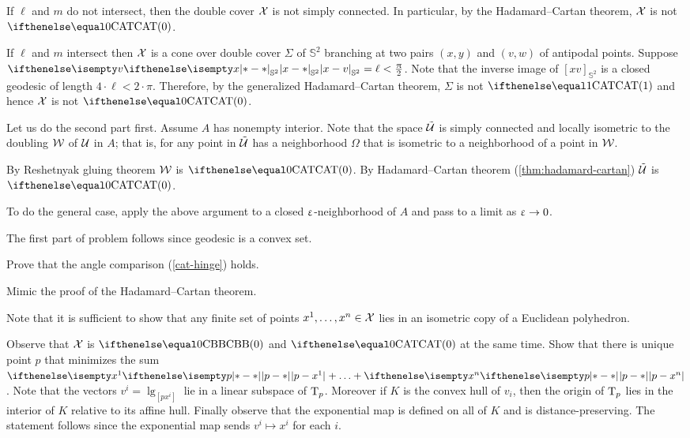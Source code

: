 If $\ell$ and $m$ do not intersect, then the double cover $\mathcal{X}$ is not simply connected.
In particular, by the Hadamard--Cartan theorem, $\mathcal{X}$ is not $\CAT0$.

If $\ell$ and $m$ intersect then $\mathcal{X}$ is a cone over double cover $\Sigma$ of $\mathbb{S}^2$ branching at two pairs $(x,y)$ and $(v,w)$ of antipodal points.
Suppose $\dist{x}{v}{\mathbb{S}^2}=\ell<\tfrac\pi2$.
Note that the inverse image of $[xv]_{\mathbb{S}^2}$ is a closed geodesic of length $4\cdot\ell<2\cdot\pi$.
Therefore, by the generalized Hadamard--Cartan theorem, $\Sigma$ is not $\CAT1$ and hence $\mathcal{X}$ is not $\CAT0$.

Let us do the second part first.
Assume $A$ has nonempty interior. 
Note that the space $\tilde{\mathcal{U}}$ is simply connected and locally isometric to the doubling $\mathcal{W}$ of $\mathcal{U}$ in $A$;
that is, for any point in $\tilde{\mathcal{U}}$ has a neighborhood $\Omega$ that is isometric to a neighborhood of a point in $\mathcal{W}$.

By Reshetnyak gluing theorem $\mathcal{W}$ is $\CAT0$.
By Hadamard--Cartan theorem (\ref{thm:hadamard-cartan}) $\tilde{\mathcal{U}}$ is $\CAT0$.

To do the general case, apply the above argument to a closed $\upvarepsilon$-neighborhood of $A$
and pass to a limit as $\eps\to 0$.

The first part of problem follows since geodesic is a convex set.

 Prove that the angle comparison (\ref{cat-hinge}) holds.

 Mimic the proof of the Hadamard--Cartan theorem.

Note that it is sufficient to show that any finite set of points $x^1,\dots,x^n\in\spc{X}$ lies in an isometric copy of a Euclidean polyhedron.

Observe that $\mathcal{X}$ is $\Alex0$ and $\CAT0$ at the same time.
Show that there is unique point $p$ that minimizes the sum $\dist{p}{x^1}{}+\dots+\dist{p}{x^n}{}$.
Note that the vectors $v^i=\lg_{[{p}{x^i}]}$ lie in a linear subspace of $\text{\rm T}_p$.
Moreover if $K$ is the convex hull of $v_i$, then the origin of $\text{\rm T}_p$ lies in the interior of $K$ relative to its affine hull.
Finally observe that the exponential map is defined on all of $K$ and is distance-preserving.
The statement follows since the exponential map sends $v^i\mapsto x^i$ for each $i$.

